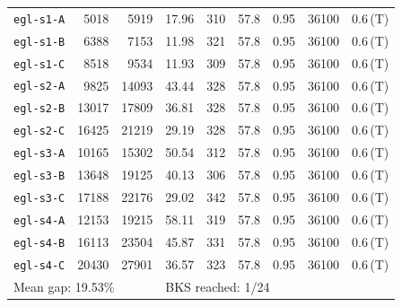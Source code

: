 \begin{longtable}{lrrrrrrrl}
\texttt{egl-s1-A} & 5018 & 5919 & 17.96 & 310 & 57.8 & 0.95 & 36100 & 0.6\,(T) \\
\texttt{egl-s1-B} & 6388 & 7153 & 11.98 & 321 & 57.8 & 0.95 & 36100 & 0.6\,(T) \\
\texttt{egl-s1-C} & 8518 & 9534 & 11.93 & 309 & 57.8 & 0.95 & 36100 & 0.6\,(T) \\
\texttt{egl-s2-A} & 9825 & 14093 & 43.44 & 328 & 57.8 & 0.95 & 36100 & 0.6\,(T) \\
\texttt{egl-s2-B} & 13017 & 17809 & 36.81 & 328 & 57.8 & 0.95 & 36100 & 0.6\,(T) \\
\texttt{egl-s2-C} & 16425 & 21219 & 29.19 & 328 & 57.8 & 0.95 & 36100 & 0.6\,(T) \\
\texttt{egl-s3-A} & 10165 & 15302 & 50.54 & 312 & 57.8 & 0.95 & 36100 & 0.6\,(T) \\
\texttt{egl-s3-B} & 13648 & 19125 & 40.13 & 306 & 57.8 & 0.95 & 36100 & 0.6\,(T) \\
\texttt{egl-s3-C} & 17188 & 22176 & 29.02 & 342 & 57.8 & 0.95 & 36100 & 0.6\,(T) \\
\texttt{egl-s4-A} & 12153 & 19215 & 58.11 & 319 & 57.8 & 0.95 & 36100 & 0.6\,(T) \\
\texttt{egl-s4-B} & 16113 & 23504 & 45.87 & 331 & 57.8 & 0.95 & 36100 & 0.6\,(T) \\
\texttt{egl-s4-C} & 20430 & 27901 & 36.57 & 323 & 57.8 & 0.95 & 36100 & 0.6\,(T) \\
\midrule
\multicolumn{3}{l}{Mean gap: 19.53\%} & \multicolumn{6}{l}{BKS reached: 1/24} \\
\end{longtable}
\endgroup